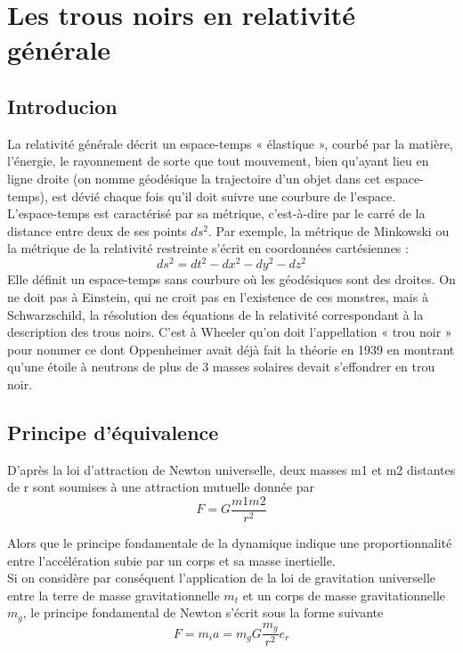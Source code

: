 \documentclass[12pt,  a4paper, openright]{report} %
\begin{document}
	\chapter{Les trous noirs en relativité générale}
	\section{Introducion}
	La relativité générale décrit un espace-temps « élastique », courbé par la matière, l’énergie, le rayonnement de sorte que tout mouvement, bien qu’ayant lieu en ligne droite (on nomme géodésique la trajectoire d’un objet dans cet espace-temps), est dévié chaque fois qu’il doit suivre une courbure de l’espace.\\
	L’espace-temps est caractérisé par sa métrique, c’est-à-dire par le carré de la distance entre
	deux de ses points $ds^{2}$. Par exemple, la métrique de Minkowski ou la métrique de la relativité
	restreinte s’écrit en coordonnées cartésiennes :
	\begin{equation}
	ds^{2} = dt^{2} -dx ^{2} - dy^{2} - dz^{2}
	\end{equation}
	Elle définit un espace-temps sans courbure où les géodésiques sont des droites.
	On ne doit pas à Einstein, qui ne croit pas en l’existence de ces monstres, mais à Schwarzschild, la résolution des équations de la relativité correspondant à la description des trous noirs. C’est à Wheeler qu’on doit l’appellation « trou noir » pour nommer ce dont Oppenheimer avait déjà fait la théorie en 1939 en montrant qu’une étoile à neutrons de plus de 3 masses solaires devait s’effondrer en trou noir.
	\section{Principe d’équivalence}
	D'après la loi d'attraction de Newton universelle, deux masses m1 et m2 distantes de
	r sont soumises à une attraction mutuelle donnée par
	\begin{equation}
	F = G\dfrac{m1m2}{r^{2}} 
	\end{equation}
	
	Alors que le principe fondamentale de la dynamique indique une proportionnalité entre
	l'accélération subie par un corps et sa masse inertielle.\\
	Si on considère par conséquent l'application de la loi de gravitation universelle entre la
	terre de masse gravitationnelle $m_{t}$ et un corps de masse gravitationnelle $m_{g}$, le principe
	fondamental de Newton s’écrit sous la forme suivante
	\begin{equation}
	F=m_{i}a= m_{g}G\dfrac{m_{g}}{r^{2}}e_{r}
	\end{equation}
	
\end{document}
